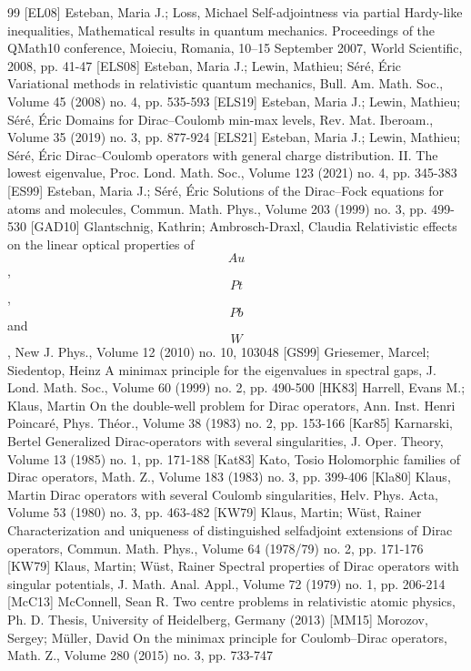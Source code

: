 \begin{thebibliography}{99}
 [EL08] Esteban, Maria J.; Loss, Michael Self-adjointness via partial Hardy-like inequalities, Mathematical results in quantum mechanics. Proceedings of the QMath10 conference, Moieciu, Romania, 10–15 September 2007, World Scientific, 2008, pp. 41-47
 [ELS08] Esteban, Maria J.; Lewin, Mathieu; Séré, Éric Variational methods in relativistic quantum mechanics, Bull. Am. Math. Soc., Volume 45 (2008) no. 4, pp. 535-593
 [ELS19] Esteban, Maria J.; Lewin, Mathieu; Séré, Éric Domains for Dirac–Coulomb min-max levels, Rev. Mat. Iberoam., Volume 35 (2019) no. 3, pp. 877-924
 [ELS21] Esteban, Maria J.; Lewin, Mathieu; Séré, Éric Dirac–Coulomb operators with general charge distribution. II. The lowest eigenvalue, Proc. Lond. Math. Soc., Volume 123 (2021) no. 4, pp. 345-383
 [ES99] Esteban, Maria J.; Séré, Éric Solutions of the Dirac–Fock equations for atoms and molecules, Commun. Math. Phys., Volume 203 (1999) no. 3, pp. 499-530
 [GAD10] Glantschnig, Kathrin; Ambrosch-Draxl, Claudia Relativistic effects on the linear optical properties of $${Au}$$, $${Pt}$$, $${Pb}$$ and $${W}$$, New J. Phys., Volume 12 (2010) no. 10, 103048
 [GS99] Griesemer, Marcel; Siedentop, Heinz A minimax principle for the eigenvalues in spectral gaps, J. Lond. Math. Soc., Volume 60 (1999) no. 2, pp. 490-500
 [HK83] Harrell, Evans M.; Klaus, Martin On the double-well problem for Dirac operators, Ann. Inst. Henri Poincaré, Phys. Théor., Volume 38 (1983) no. 2, pp. 153-166
 [Kar85] Karnarski, Bertel Generalized Dirac-operators with several singularities, J. Oper. Theory, Volume 13 (1985) no. 1, pp. 171-188
 [Kat83] Kato, Tosio Holomorphic families of Dirac operators, Math. Z., Volume 183 (1983) no. 3, pp. 399-406
 [Kla80] Klaus, Martin Dirac operators with several Coulomb singularities, Helv. Phys. Acta, Volume 53 (1980) no. 3, pp. 463-482
 [KW79] Klaus, Martin; Wüst, Rainer Characterization and uniqueness of distinguished selfadjoint extensions of Dirac operators, Commun. Math. Phys., Volume 64 (1978/79) no. 2, pp. 171-176
 [KW79] Klaus, Martin; Wüst, Rainer Spectral properties of Dirac operators with singular potentials, J. Math. Anal. Appl., Volume 72 (1979) no. 1, pp. 206-214
 [McC13] McConnell, Sean R. Two centre problems in relativistic atomic physics, Ph. D. Thesis, University of Heidelberg, Germany (2013)
 [MM15] Morozov, Sergey; Müller, David On the minimax principle for Coulomb–Dirac operators, Math. Z., Volume 280 (2015) no. 3, pp. 733-747

\end{thebibliography}
